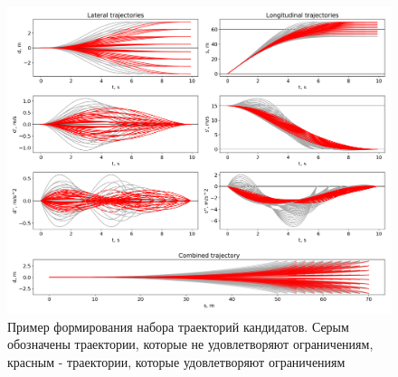 \begin{figure}[h]
      \centering
      \includegraphics[width=\linewidth]{images/quintic_results_1}
      \caption{Пример формирования набора траекторий кандидатов. Серым обозначены траектории, которые не удовлетворяют
      ограничениям, красным - траектории, которые удовлетворяют ограничениям}
      \label{img:quintic_results_1}
\end{figure}


